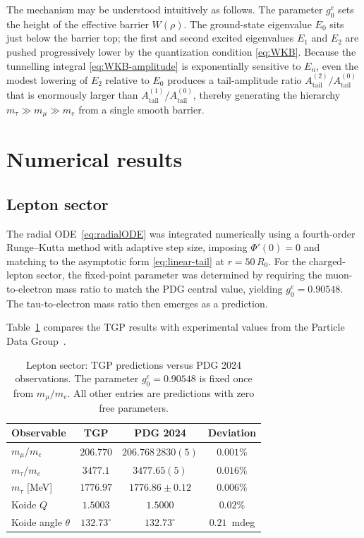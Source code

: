 \documentclass[11pt,a4paper]{article}
\newcommand{\gz}{g_0^e}
\newcommand{\Atail}{A_{\mathrm{tail}}}
\newcommand{\mt}{m_\tau}
\newcommand{\mmu}{m_\mu}
\newcommand{\me}{m_e}
\begin{document}
The mechanism may be understood intuitively as follows.  The
parameter $\gz$ sets the height of the effective barrier $W(\rho)$.
The ground-state eigenvalue $E_0$ sits just below the barrier top;
the first and second excited eigenvalues $E_1$ and $E_2$ are
pushed progressively lower by the quantization condition
\eqref{eq:WKB}.  Because the tunnelling integral
\eqref{eq:WKB-amplitude} is exponentially sensitive to $E_n$,
even the modest lowering of $E_2$ relative to $E_0$ produces
a tail-amplitude ratio $\Atail^{(2)}/\Atail^{(0)}$ that is
enormously larger than $\Atail^{(1)}/\Atail^{(0)}$, thereby
generating the hierarchy $\mt \gg \mmu \gg \me$ from a single
smooth barrier.

\section{Numerical results}\label{sec:numerics}

\subsection{Lepton sector}

The radial ODE~\eqref{eq:radialODE} was integrated numerically
using a fourth-order Runge--Kutta method with adaptive step size,
imposing $\Phi'(0)=0$ and matching to the asymptotic form
\eqref{eq:linear-tail} at $r = 50\,R_0$.
For the charged-lepton sector, the fixed-point parameter was
determined by requiring the muon-to-electron mass ratio to match
the PDG central value, yielding $\gz = 0.90548$.
The tau-to-electron mass ratio then emerges as a prediction.

Table~\ref{tab:leptons} compares the TGP results with
experimental values from the Particle Data Group~\cite{PDG2024}.

\begin{table}[ht]
\centering
\caption{Lepton sector: TGP predictions versus PDG 2024
observations.  The parameter $\gz = 0.90548$ is fixed once from
$\mmu/\me$.  All other entries are predictions with zero free
parameters.}
\label{tab:leptons}
\begin{tabular}{@{}lccc@{}}
\toprule
Observable & TGP & PDG 2024 & Deviation \\
\midrule
$\mmu/\me$
  & $206.770$ & $206.768\,2830(5)$ & $0.001\%$ \\[3pt]
$\mt/\me$
  & $3477.1$ & $3477.65(5)$ & $0.016\%$ \\[3pt]
$\mt$ [MeV]
  & $1776.97$ & $1776.86\pm 0.12$ & $0.006\%$ \\[3pt]
Koide $Q$
  & $1.5003$ & $1.5000$ & $0.02\%$ \\[3pt]
Koide angle $\theta$
  & $132.73^\circ$ & $132.73^\circ$ & $0.21$~mdeg \\
\bottomrule
\end{tabular}
\end{table}
\end{document}
